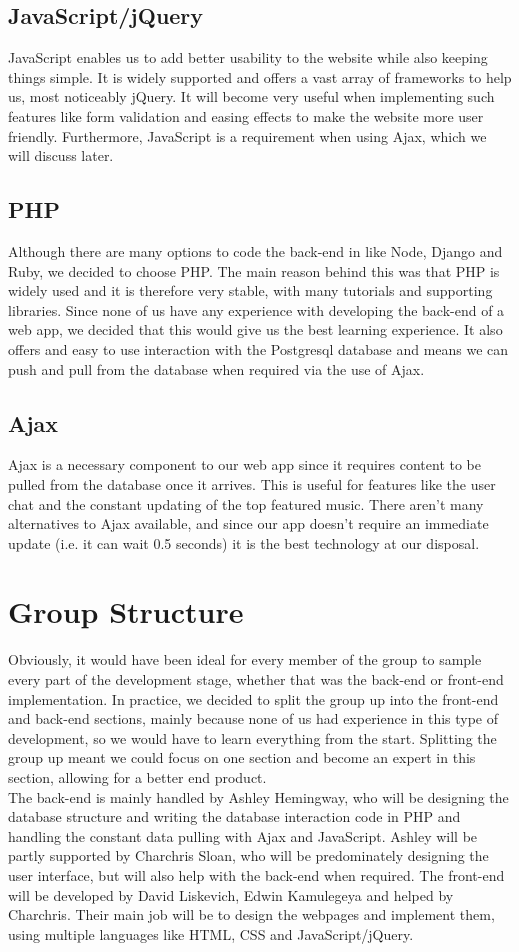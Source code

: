 \documentclass{article}
\begin{document}
\subsection{JavaScript/jQuery}
JavaScript enables us to add better usability to the website while also keeping things simple. It is widely supported and offers a vast array of frameworks to help us, most noticeably jQuery. It will become very useful when implementing such features like form validation and easing effects to make the website more user friendly. Furthermore, JavaScript is a requirement when using Ajax, which we will discuss later.

\subsection{PHP}
Although there are many options to code the back-end in like Node, Django and Ruby, we decided to choose PHP. The main reason behind this was that PHP is widely used and it is therefore very stable, with many tutorials and supporting libraries. Since none of us have any experience with  developing the back-end of a web app, we decided that this would give us the best learning experience. It also offers and easy to use interaction with the Postgresql database and means we can push and pull from the database when required via the use of Ajax.

\subsection{Ajax}
Ajax is a necessary component to our web app since it requires content to be pulled from the database once it arrives. This is useful for features like the user chat and the constant updating of the top featured music. There aren't many alternatives to Ajax available, and since our app doesn't require an immediate update (i.e. it can wait 0.5 seconds) it is the best technology at our disposal.

\section{Group Structure}
Obviously, it would have been ideal for every member of the group to sample every part of the development stage, whether that was the back-end or front-end implementation. In practice, we decided to split the group up into the front-end and back-end sections, mainly because none of us had experience in this type of development, so we would have to learn everything from the start. Splitting the group up meant we could focus on one section and become an expert in this section, allowing for a better end product. \\
\noindent The back-end is mainly handled by Ashley Hemingway, who will be designing the database structure and writing the database interaction code in PHP and handling the constant data pulling with Ajax and JavaScript. Ashley will be partly supported by Charchris Sloan, who will be predominately designing the user interface, but will also help with the back-end when required. The front-end will be developed by David Liskevich, Edwin Kamulegeya and helped by Charchris. Their main job will be to design the webpages and implement them, using multiple languages like HTML, CSS and JavaScript/jQuery.
\end{document}

